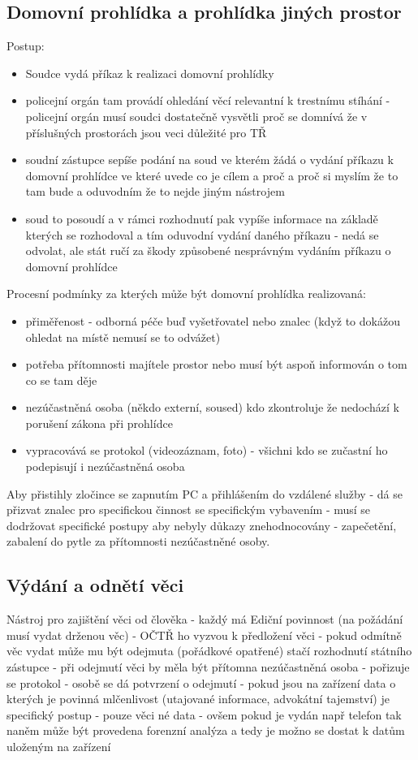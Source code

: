 \subsection*{Domovní prohlídka a prohlídka jiných prostor}
Postup:
\begin{itemize}
    \item Soudce vydá příkaz k realizaci domovní prohlídky
    \item  policejní orgán tam provádí ohledání věcí relevantní k trestnímu stíhání - policejní orgán musí soudci dostatečně vysvětli proč se domnívá že v příslušných prostorách jsou veci důležité pro TŘ
    \item soudní zástupce sepíše podání na soud ve kterém žádá o vydání příkazu k domovní prohlídce ve které uvede co je cílem a proč a proč si myslím že to tam bude a oduvodním že to nejde jiným nástrojem
    \item  soud to posoudí a v rámci rozhodnutí pak vypíše informace na základě kterých se rozhodoval a tím oduvodní vydání daného příkazu - nedá se odvolat, ale stát ručí za škody způsobené nesprávným vydáním příkazu o domovní prohlídce
\end{itemize}
Procesní podmínky za kterých může být domovní prohlídka realizovaná:
\begin{itemize}
    \item přiměřenost -  odborná péče buď vyšetřovatel nebo znalec (když to dokážou ohledat na místě nemusí se to odvážet)
    \item potřeba přítomnosti majítele prostor nebo musí být aspoň informován o tom co se tam děje
    \item nezúčastněná osoba (někdo externí, soused) kdo zkontroluje že nedochází k porušení zákona při prohlídce
    \item vypracovává se protokol (videozáznam, foto) - všichni kdo se zučastní ho podepisují i nezúčastněná osoba
\end{itemize}
Aby přistihly zločince se zapnutím PC a přihlášením do vzdálené služby - dá se přizvat znalec pro specifickou
činnost se specifickým vybavením - musí se dodržovat specifické postupy aby nebyly důkazy znehodnocovány - zapečetění, zabalení do pytle za přítomnosti nezúčastněné osoby.

\subsection*{Výdání a odnětí věci}
Nástroj pro zajištění věci od člověka - každý má Ediční povinnost (na požádání musí vydat drženou věc) - OČTŘ ho vyzvou k předložení věci - pokud odmítně věc vydat může mu být odejmuta (pořádkové opatřené) stačí rozhodnutí státního zástupce - při odejmutí věci by měla být přítomna nezúčastněná osoba - pořizuje se protokol - osobě se dá potvrzení o odejmutí - pokud jsou na zařízení data o kterých je povinná mlčenlivost (utajované informace, advokátní tajemství) je specifický postup - pouze věci né data - ovšem pokud je vydán např telefon tak naněm může být provedena forenzní analýza a tedy je možno se dostat k datům uloženým na zařízení

